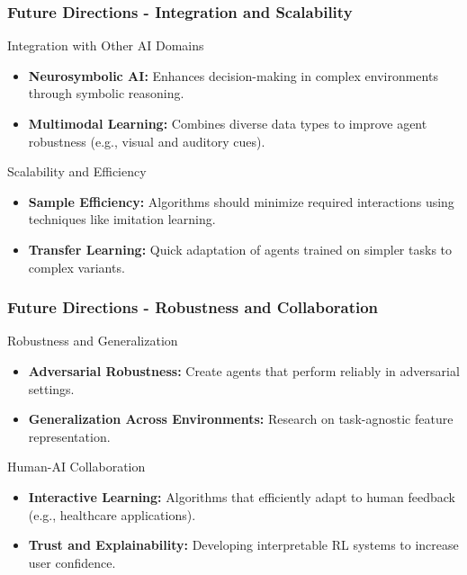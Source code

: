 \documentclass[aspectratio=169]{beamer}
\begin{document}
\begin{frame}[fragile]
    \frametitle{Future Directions - Integration and Scalability}
    \begin{block}{Integration with Other AI Domains}
        \begin{itemize}
            \item \textbf{Neurosymbolic AI:} Enhances decision-making in complex environments through symbolic reasoning.
            \item \textbf{Multimodal Learning:} Combines diverse data types to improve agent robustness (e.g., visual and auditory cues).
        \end{itemize}
    \end{block}
    
    \begin{block}{Scalability and Efficiency}
        \begin{itemize}
            \item \textbf{Sample Efficiency:} Algorithms should minimize required interactions using techniques like imitation learning.
            \item \textbf{Transfer Learning:} Quick adaptation of agents trained on simpler tasks to complex variants.
        \end{itemize}
    \end{block}
\end{frame}

\begin{frame}[fragile]
    \frametitle{Future Directions - Robustness and Collaboration}
    \begin{block}{Robustness and Generalization}
        \begin{itemize}
            \item \textbf{Adversarial Robustness:} Create agents that perform reliably in adversarial settings.
            \item \textbf{Generalization Across Environments:} Research on task-agnostic feature representation.
        \end{itemize}
    \end{block}
    
    \begin{block}{Human-AI Collaboration}
        \begin{itemize}
            \item \textbf{Interactive Learning:} Algorithms that efficiently adapt to human feedback (e.g., healthcare applications).
            \item \textbf{Trust and Explainability:} Developing interpretable RL systems to increase user confidence.
        \end{itemize}
    \end{block}
\end{frame}
\end{document}
